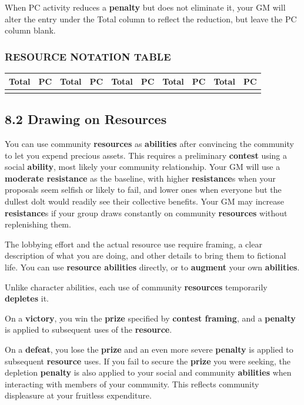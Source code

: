 \documentclass[
]{article}
\begin{document}
When PC activity reduces a \textbf{penalty} but does not eliminate it,
your GM will alter the entry under the Total column to reflect the
reduction, but leave the PC column blank.

\hypertarget{resource-notation-table}{%
\subsubsection{RESOURCE NOTATION TABLE}\label{resource-notation-table}}

\begin{longtable}[]{@{}llllllllll@{}}
\toprule
Total & PC & Total & PC & Total & PC & Total & PC & Total &
PC\tabularnewline
\midrule
\endhead
& & & & & & & & &\tabularnewline
\bottomrule
\end{longtable}

\hypertarget{drawing-on-resources}{%
\subsection{8.2 Drawing on Resources}\label{drawing-on-resources}}

You can use community \textbf{resources} as \textbf{abilities} after
convincing the community to let you expend precious assets. This
requires a preliminary \textbf{contest} using a social \textbf{ability},
most likely your community relationship. Your GM will use a
\textbf{moderate resistance} as the baseline, with higher
\textbf{resistance}s when your proposals seem selfish or likely to fail,
and lower ones when everyone but the dullest dolt would readily see
their collective benefits. Your GM may increase \textbf{resistance}s if
your group draws constantly on community \textbf{resources} without
replenishing them.

The lobbying effort and the actual resource use require framing, a clear
description of what you are doing, and other details to bring them to
fictional life. You can use \textbf{resource abilities} directly, or to
\textbf{augment} your own \textbf{abilities}.

Unlike character abilities, each use of community \textbf{resources}
temporarily \textbf{depletes} it.

On a \textbf{victory}, you win the \textbf{prize} specified by
\textbf{contest framing}, and a \textbf{penalty} is applied to
subsequent uses of the \textbf{resource}.

On a \textbf{defeat}, you lose the \textbf{prize} and an even more
severe \textbf{penalty} is applied to subsequent \textbf{resource} uses.
If you fail to secure the \textbf{prize} you were seeking, the depletion
\textbf{penalty} is also applied to your social and community
\textbf{abilities} when interacting with members of your community. This
reflects community displeasure at your fruitless expenditure.
\end{document}
